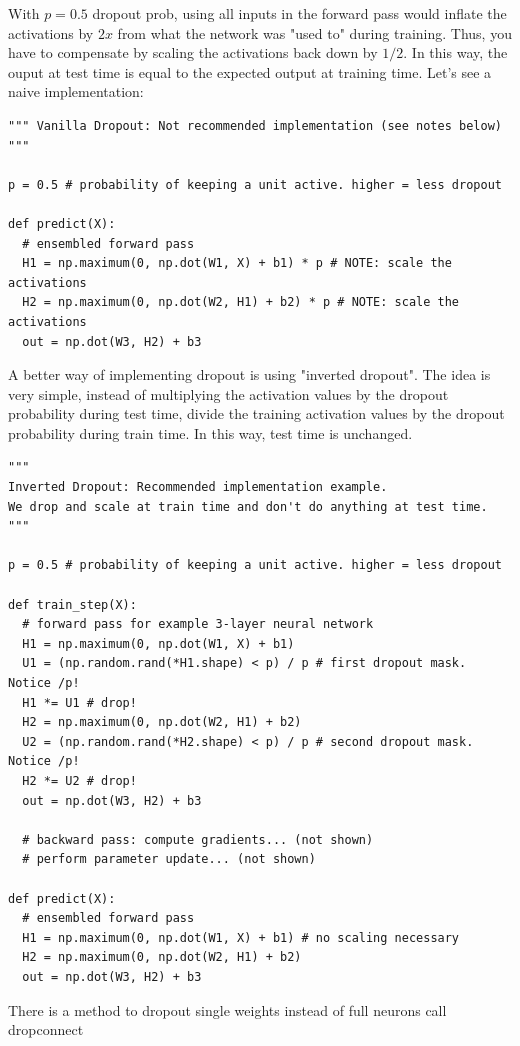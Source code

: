 With $p=0.5$ dropout prob, using all inputs in the forward pass would inflate the activations by $2x$ from what the network was "used to" during training. Thus, you have to compensate by scaling the activations back down by $1/2$. In this way, the ouput at test time is equal to the expected output at training time. Let's see a naive implementation:
\begin{lstlisting}[frame=single] 
""" Vanilla Dropout: Not recommended implementation (see notes below) """

p = 0.5 # probability of keeping a unit active. higher = less dropout

def predict(X):
  # ensembled forward pass
  H1 = np.maximum(0, np.dot(W1, X) + b1) * p # NOTE: scale the activations
  H2 = np.maximum(0, np.dot(W2, H1) + b2) * p # NOTE: scale the activations
  out = np.dot(W3, H2) + b3
\end{lstlisting}

A better way of implementing dropout is using "inverted dropout". The idea is very simple, instead of multiplying the activation values by the dropout probability during test time, divide the training activation values by the dropout probability during train time.  In this way, test time is unchanged.

\begin{lstlisting}[frame=single]
"""
Inverted Dropout: Recommended implementation example.
We drop and scale at train time and don't do anything at test time.
"""

p = 0.5 # probability of keeping a unit active. higher = less dropout

def train_step(X):
  # forward pass for example 3-layer neural network
  H1 = np.maximum(0, np.dot(W1, X) + b1)
  U1 = (np.random.rand(*H1.shape) < p) / p # first dropout mask. Notice /p!
  H1 *= U1 # drop!
  H2 = np.maximum(0, np.dot(W2, H1) + b2)
  U2 = (np.random.rand(*H2.shape) < p) / p # second dropout mask. Notice /p!
  H2 *= U2 # drop!
  out = np.dot(W3, H2) + b3

  # backward pass: compute gradients... (not shown)
  # perform parameter update... (not shown)

def predict(X):
  # ensembled forward pass
  H1 = np.maximum(0, np.dot(W1, X) + b1) # no scaling necessary
  H2 = np.maximum(0, np.dot(W2, H1) + b2)
  out = np.dot(W3, H2) + b3
\end{lstlisting}

There is a method to dropout single weights instead of full neurons call dropconnect